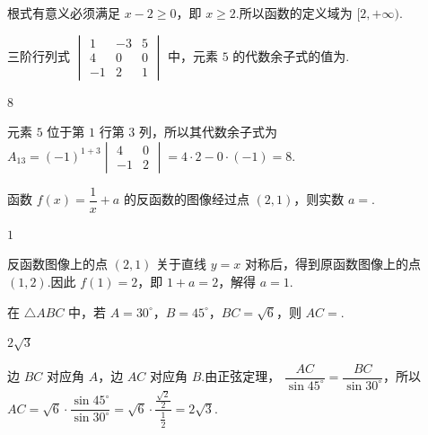 \begin{solution}
根式有意义必须满足 \(x-2\geq0\)，即 \(x\geq2\).所以函数的定义域为 \([2,+\infty)\).
\end{solution}

\begin{problem}
三阶行列式 \(\begin{vmatrix} 1 & -3 & 5 \\ 4 & 0 & 0 \\ -1 & 2 & 1 \end{vmatrix}\) 中，元素 \(5\) 的代数余子式的值为\fillinblank{}.
\end{problem}

\begin{answer}
\(8\)
\end{answer}

\begin{solution}
元素 \(5\) 位于第 \(1\) 行第 \(3\) 列，所以其代数余子式为
\(A_{13}=(-1)^{1+3}\begin{vmatrix}4&0\\-1&2\end{vmatrix}=4\cdot2-0\cdot(-1)=8\).
\end{solution}

\begin{problem}
函数 \(f(x)=\dfrac1x+a\) 的反函数的图像经过点 \((2,1)\)，则实数 \(a=\)\fillinblank{}.
\end{problem}

\begin{answer}
\(1\)
\end{answer}

\begin{solution}
反函数图像上的点 \((2,1)\) 关于直线 \(y=x\) 对称后，得到原函数图像上的点 \((1,2)\).因此 \(f(1)=2\)，即 \(1+a=2\)，解得 \(a=1\).
\end{solution}

\begin{problem}
在 \(\triangle ABC\) 中，若 \(A=30^\circ\)，\(B=45^\circ\)，\(BC=\sqrt6\)，则 \(AC=\)\fillinblank{}.
\end{problem}

\begin{answer}
\(2\sqrt3\)
\end{answer}

\begin{solution}
边 \(BC\) 对应角 \(A\)，边 \(AC\) 对应角 \(B\).由正弦定理，
\(\dfrac{AC}{\sin45^\circ}=\dfrac{BC}{\sin30^\circ}\)，所以
\(AC=\sqrt6\cdot\dfrac{\sin45^\circ}{\sin30^\circ}=\sqrt6\cdot\dfrac{\frac{\sqrt2}{2}}{\frac{1}{2}}=2\sqrt3\).
\end{solution}


